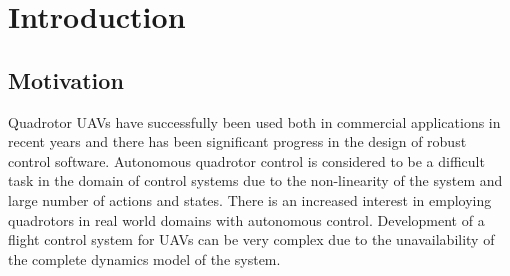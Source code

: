 \documentclass[hidelinks,BTech]{iitmdiss}
\begin{document}






\clearpage




\chapter{Introduction}
\section{Motivation}
Quadrotor UAVs have successfully been used both in commercial applications in recent years and there has been significant progress in the design of robust control software. Autonomous quadrotor control is considered to be a difficult task in the domain of control systems due to the non-linearity of the system and large number of actions and states. There is an increased interest in employing quadrotors in real world domains with autonomous control. Development of a flight control system for UAVs can be very complex due to the unavailability of the complete dynamics model of the system. 
\end{document}
